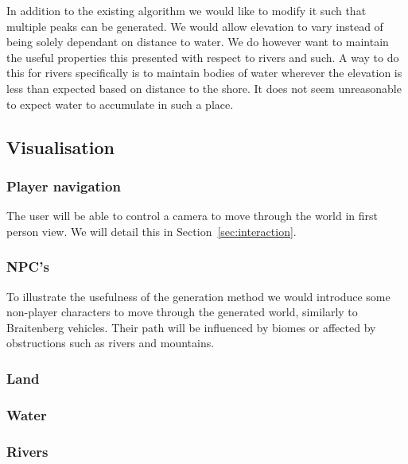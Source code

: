 In addition to the existing algorithm we would like to modify it such that multiple peaks can be generated. We would allow elevation to vary instead of being solely dependant on distance to water. We do however want to maintain the useful properties this presented with respect to rivers and such. A way to do this for rivers specifically is to maintain bodies of water wherever the elevation is less than expected based on distance to the shore. It does not seem unreasonable to expect water to accumulate in such a place. 

\subsection{Visualisation}

\subsubsection{Player navigation}

The user will be able to control a camera to move through the world in first person view.
We will detail this in Section~\ref{sec:interaction}.

\subsubsection{NPC's}

To illustrate the usefulness of the generation method we would introduce some non-player characters to move through the generated world, similarly to Braitenberg vehicles. Their path will be influenced by biomes or affected by obstructions such as rivers and mountains.

\subsubsection{Land}

\subsubsection{Water}

\subsubsection{Rivers}
